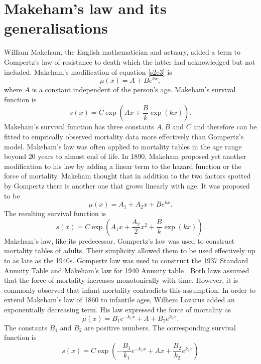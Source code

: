 \documentclass{article}
\numberwithin{equation}{section}
\begin{document}
\section{Makeham's law and its generalisations}\label{s3}
William Makeham, the English mathematician and actuary, added a term to
Gompertz's law of resistance to death which the latter had acknowledged but
not included. Makeham's modification \cite{makeham1867law} of equation 
\eqref{s2e3} is
\begin{equation}\label{s3e1}
\mu(x) = A + Be^{kx},
\end{equation}
where $A$ is a constant independent of the person's age. Makeham's survival
function is
\begin{equation}\label{s3e2}
s(x) = C\exp\left(Ax + \frac{B}{k}\exp(kx)\right).
\end{equation}
Makeham's survival function has three constants $A, B$ and $C$ and therefore
can be fitted to emprically observed mortality data more effectively than
Gompertz's model. Makeham's law was often applied to mortality tables in the
age range beyond $20$ years to almost end of life\cite{jordan1967society}. 
In 1890\cite{makeham1890further}, Makeham proposed yet another modification to 
his law by adding a linear term to the hazard function or the force of 
mortality. Makeham thought that in addition to the two factors spotted by
Gompertz there is another one that grows linearly with age. It was proposed to 
be
\begin{equation}\label{s3e3}
\mu(x) = A_1 + A_2x + Be^{kx}.
\end{equation}
The resulting survival function is
\begin{equation}\label{s3e4}
s(x) = C\exp\left(A_1x + \frac{A_2}{2}x^2 + \frac{B}{k}\exp(kx)\right).
\end{equation}
Makeham's law, like its predecessor, Gompertz's law was used to construct
mortality tables of adults. Their simplicity allowed them to be used 
effectively up to as late as the 1940s. Gompertz law was used to construct
the 1937 Standard Annuity Table and Makeham's law for 1940 Annuity table
\cite{jordan1967society}. Both laws assumed that the force of mortality 
increases monotonically with time. However, it is commonly observed that 
infant mortality contradicts this assumption. In order to extend Makeham's
law of 1860 to infantile ages, Wilhem Lazarus \cite{lazarus1867ueber} added
an exponentially decreasing term. His law expressed the force of mortality
as 
\begin{equation}\label{s3e5}
\mu(x) = B_1 e^{-k_1x} + A + B_2e^{k_2 x}.
\end{equation}
The constants $B_1$ and $B_2$ are positive numbers. The corresponding survival 
function is
\begin{equation}\label{s3e6}
s(x) = 
C\exp\left(-\frac{B_1}{k_1}e^{-k_1x} + Ax + \frac{B_2}{k_2}e^{k_2x}\right)
\end{equation}
\end{document}

